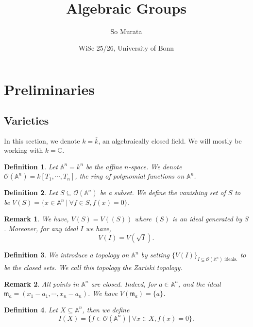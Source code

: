 \documentclass[10pt]{article}
\title{Algebraic Groups}
\author{So Murata}
\date{WiSe 25/26, University of Bonn}
\newtheorem{definition}{Definition}[section]
\newtheorem{remark}{Remark}[section]
\numberwithin{equation}{theorem}
\newcommand{\C}[0]{\mathbb{C}}
\newcommand{\A}[0]{\mathbb{A}}
\begin{document}
\maketitle

\section{Preliminaries}

\subsection{Varieties}

In this section, we denote $k=\overline{k}$, an algebraically closed field. We will mostly be working with $k=\C$. 

\begin{definition}
Let $\A^n=k^n$ be the affine $n$-space. We denote $\mathcal{O}(\A^n)=k[T_1,\cdots,T_n]$, the ring of polynomial functions on $\A^n$. 
\end{definition}

\begin{definition}
Let $S\subseteq\mathcal{O}(\A^n)$ be a subset. We define the vanishing set of $S$ to be $V(S)=\{x\in\A^n\:|\: \forall f\in S, f(x) = 0\}$.
\end{definition}

\begin{remark}
We have, $V(S)=V((S))$ where $(S)$ is an ideal generated by $S$. Moreover, for any ideal $I$ we have,
\begin{equation*}
V(I) = V\left(\sqrt{I}\right).
\end{equation*}
\end{remark}

\begin{definition}
We introduce a topology on $\A^n$ by setting $\{V(I)\}_{I\subseteq \mathcal{O}(\A^n)\text{ ideals.}}$ to be the closed sets. We call this topology the Zariski topology.
\end{definition}

\begin{remark}
All points in $\A^n$ are closed. Indeed, for $a\in \A^n$, and the ideal $\mathfrak{m}_a = (x_1-a_1,\cdots,x_n-a_n)$. We have $V(\mathfrak{m}_a) = \{a\}$. \label{points_all_closed}
\end{remark}

\begin{definition}
Let $X\subseteq\A^n$, then we define 
\begin{equation*}
I(X) = \{f\in\mathcal{O}(\A^n)\:|\:\forall x\in X, f(x) = 0\}.
\end{equation*}
\end{definition}
\end{document}
